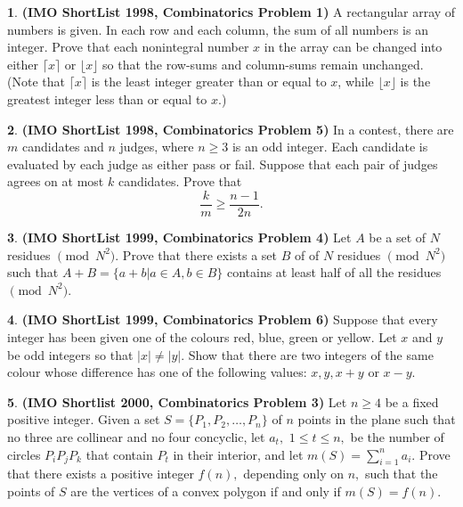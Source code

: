 \documentclass{article}
\newcommand{\equal}{=}
\theoremstyle{definition}
\newtheorem{p}{}
\begin{document}
\begin{p}{\bf(IMO ShortList 1998, Combinatorics Problem 1)}
A rectangular array of numbers is given. In each row and each column, the sum of all numbers is an integer. Prove that each nonintegral number $x$ in the array can be changed into either $\lceil x\rceil $ or $\lfloor x\rfloor $ so that the row-sums and column-sums remain unchanged. (Note that $\lceil x\rceil $ is the least integer greater than or equal to $x$, while $\lfloor x\rfloor $ is the greatest integer less than or equal to $x$.)
\end{p}




\begin{p}{\bf(IMO ShortList 1998, Combinatorics Problem 5)}
In a contest, there are $m$ candidates and $n$ judges, where $n\geq 3$ is an odd integer. Each candidate is evaluated by each judge as either pass or fail. Suppose that each pair of judges agrees on at most $k$ candidates. Prove that \[{\frac{k}{m}} \geq {\frac{n-1}{2n}}. \]
\end{p}





\begin{p}{\bf(IMO ShortList 1999, Combinatorics Problem 4)}
Let $A$ be a set of $N$ residues $\pmod{N^{2}}$. Prove that there exists a set $B$ of of $N$ residues $\pmod{N^{2}}$ such that $A + B = \{a+b|a \in A, b \in B\}$ contains at least half of all the residues $\pmod{N^{2}}$.
\end{p}





\begin{p}{\bf(IMO ShortList 1999, Combinatorics Problem 6)}
Suppose that every integer has been given one of the colours red, blue, green or yellow. Let $x$ and $y$ be odd integers so that $|x| \neq |y|$. Show that there are two integers of the same colour whose difference has one of the following values: $x,y,x+y$ or $x-y$.
\end{p}



\begin{p}{\bf (IMO Shortlist 2000, Combinatorics Problem 3)}
Let $ n \geq 4$ be a fixed positive integer. Given a set $ S \equal{} \{P_1, P_2, \ldots, P_n\}$ of $ n$ points in the plane such that no three are collinear and no four concyclic, let $ a_t,$ $ 1 \leq t \leq n,$ be the number of circles $ P_iP_jP_k$ that contain $ P_t$ in their interior, and let $ m(S) \equal{} \sum^n_{i\equal{}1} a_i.$ Prove that there exists a positive integer $ f(n),$ depending only on $ n,$ such that the points of $ S$ are the vertices of a convex polygon if and only if $ m(S) \equal{} f(n).$
\end{p}
\end{document}
